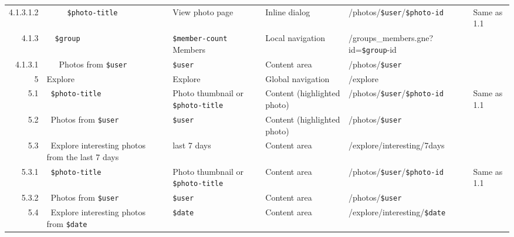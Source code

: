 \documentclass[11pt,a4paper]{article}
\newcommand{\var}[1]{\texttt{\${#1}}}
\begin{document}
\begin{landscape}
\begin{table}[h!b!p!]
\begin{center}
\begin{tiny}
\begin{tabular}{r|l|l|l|l|p{3cm}}
                    4.1.3.1.2 &
                    ~~~~~\var{photo-title} &
                    View photo page &
                    Inline dialog &
                    /photos/\var{user}/\var{photo-id} &
                    Same as 1.1 \\

                4.1.3 &
                ~~\var{group}  &
                \var{member-count} Members &
                Local navigation &
                /groups\_members.gne?id=\var{group}-id &
                \\

                  4.1.3.1 &
                  ~~~Photos from \var{user} &
                  \var{user} &
                  Content area &
                  /photos/\var{user} &
                  \\


            5 &
            Explore &
            Explore &
            Global navigation &
            /explore &
            \\

              5.1 &
              ~\var{photo-title} &
              Photo thumbnail or \var{photo-title} &
              Content (highlighted photo) &
              /photos/\var{user}/\var{photo-id} &
              Same as 1.1 \\

              5.2 &
              ~Photos from \var{user} &
              \var{user} &
              Content (highlighted photo) &
              /photos/\var{user} &
              \\

              5.3 &
              ~Explore interesting photos from the last 7 days &
              last 7 days &
              Content area &
              /explore/interesting/7days &
              \\

                5.3.1 &
                ~\var{photo-title} &
                Photo thumbnail or \var{photo-title} &
                Content area &
                /photos/\var{user}/\var{photo-id} &
                Same as 1.1 \\

                5.3.2 &
                ~Photos from \var{user} &
                \var{user} &
                Content area &
                /photos/\var{user} &
                \\

              5.4 &
              ~Explore interesting photos from \var{date} &
              \var{date} &
              Content area &
              /explore/interesting/\var{date} &
              \\


\end{tabular}
\end{tiny}
\end{center}
\end{table}
\end{landscape}
\end{document}
